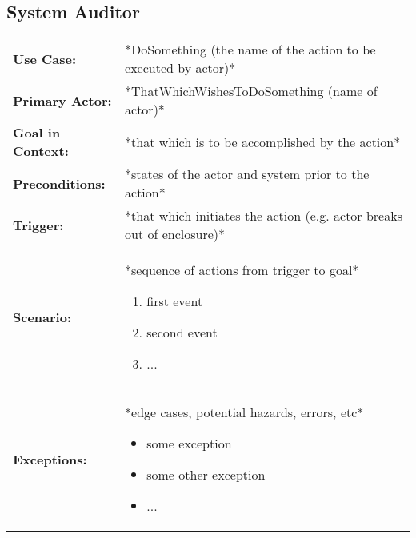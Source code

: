 \documentclass[12pt]{article}
\begin{document}
    
    
    \subsection{System Auditor}
    \begin{table}[H]
    \begin{tabular}{lp{9.9cm}}
        \hline
        \textbf{Use Case:}                     & *DoSomething (the name of the action to be executed by actor)* \\

        \textbf{Primary Actor:}                & *ThatWhichWishesToDoSomething (name of actor)*\\

        \textbf{Goal in Context:}              & *that which is to be accomplished by the action* \\

        \textbf{Preconditions:}                & *states of the actor and system prior to the action* \\

        \textbf{Trigger:}                      & *that which initiates the action (e.g. actor breaks out of enclosure)*\\

        \textbf{Scenario:}                     & *sequence of actions from trigger to goal*
                                                 \begin{enumerate}
                                                     \item first event
                                                     \item second event
                                                     \item ...
                                                 \end{enumerate} \\

        \textbf{Exceptions:}                   & *edge cases, potential hazards, errors, etc*
                                                 \begin{itemize}
                                                     \item[] some exception
                                                     \item[] some other exception
                                                     \item[] ...
                                                 \end{itemize}\\


\end{tabular}
\end{table}
\end{document}
